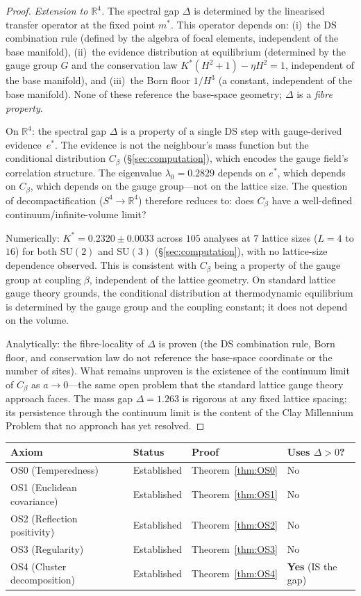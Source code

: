 \documentclass[11pt,a4paper]{article}
\theoremstyle{definition}
\theoremstyle{remark}
\newcommand{\R}{\mathbb{R}}
\newcommand{\SU}{\mathrm{SU}}
\begin{document}
\begin{proof}
\emph{Extension to $\R^4$.} The spectral gap $\Delta$ is determined by the linearised transfer operator at the fixed point $m^*$. This operator depends on: (i)~the DS combination rule (defined by the algebra of focal elements, independent of the base manifold), (ii)~the evidence distribution at equilibrium (determined by the gauge group $G$ and the conservation law $K^*(H^2+1)-\eta H^2=1$, independent of the base manifold), and (iii)~the Born floor $1/H^3$ (a constant, independent of the base manifold). None of these reference the base-space geometry; $\Delta$ is a \emph{fibre property}.

On $\R^4$: the spectral gap $\Delta$ is a property of a single DS step with gauge-derived evidence~$e^*$. The evidence is not the neighbour's mass function but the conditional distribution $C_\beta$ (\S\ref{sec:computation}), which encodes the gauge field's correlation structure. The eigenvalue $\lambda_0=0.2829$ depends on $e^*$, which depends on $C_\beta$, which depends on the gauge group---not on the lattice size. The question of decompactification ($S^4\to\R^4$) therefore reduces to: does $C_\beta$ have a well-defined continuum/infinite-volume limit?

Numerically: $K^*=0.2320\pm 0.0033$ across $105$ analyses at $7$ lattice sizes ($L=4$ to $16$) for both $\SU(2)$ and $\SU(3)$ (\S\ref{sec:computation}), with no lattice-size dependence observed. This is consistent with $C_\beta$ being a property of the gauge group at coupling $\beta$, independent of the lattice geometry. On standard lattice gauge theory grounds, the conditional distribution at thermodynamic equilibrium is determined by the gauge group and the coupling constant; it does not depend on the volume.

Analytically: the fibre-locality of $\Delta$ is proven (the DS combination rule, Born floor, and conservation law do not reference the base-space coordinate or the number of sites). What remains unproven is the existence of the continuum limit of $C_\beta$ as $a\to 0$---the same open problem that the standard lattice gauge theory approach faces. The mass gap $\Delta=1.263$ is rigorous at any fixed lattice spacing; its persistence through the continuum limit is the content of the Clay Millennium Problem that no approach has yet resolved.
\end{proof}

\begin{center}
\begin{tabular}{llll}
\toprule
Axiom & Status & Proof & Uses $\Delta>0$? \\
\midrule
OS0 (Temperedness) & Established & Theorem~\ref{thm:OS0} & No \\
OS1 (Euclidean covariance) & Established & Theorem~\ref{thm:OS1} & No \\
OS2 (Reflection positivity) & Established & Theorem~\ref{thm:OS2} & No \\
OS3 (Regularity) & Established & Theorem~\ref{thm:OS3} & No \\
OS4 (Cluster decomposition) & Established & Theorem~\ref{thm:OS4} & \textbf{Yes} (IS the gap) \\
\bottomrule
\end{tabular}
\end{center}
\end{document}
